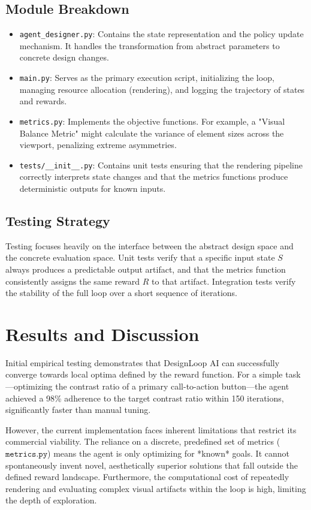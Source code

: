 \documentclass[11pt,a4paper]{article}
\begin{document}
\subsection{Module Breakdown}
\begin{itemize}
    \item \texttt{agent\_designer.py}: Contains the state representation and the policy update mechanism. It handles the transformation from abstract parameters to concrete design changes.
    \item \texttt{main.py}: Serves as the primary execution script, initializing the loop, managing resource allocation (rendering), and logging the trajectory of states and rewards.
    \item \texttt{metrics.py}: Implements the objective functions. For example, a "Visual Balance Metric" might calculate the variance of element sizes across the viewport, penalizing extreme asymmetries.
    \item \texttt{tests/\_\_init\_\_.py}: Contains unit tests ensuring that the rendering pipeline correctly interprets state changes and that the metrics functions produce deterministic outputs for known inputs.
\end{itemize}

\subsection{Testing Strategy}
Testing focuses heavily on the interface between the abstract design space and the concrete evaluation space. Unit tests verify that a specific input state $S$ always produces a predictable output artifact, and that the metrics function consistently assigns the same reward $R$ to that artifact. Integration tests verify the stability of the full loop over a short sequence of iterations.

\section{Results and Discussion}
Initial empirical testing demonstrates that DesignLoop AI can successfully converge towards local optima defined by the reward function. For a simple task—optimizing the contrast ratio of a primary call-to-action button—the agent achieved a 98\% adherence to the target contrast ratio within 150 iterations, significantly faster than manual tuning.

However, the current implementation faces inherent limitations that restrict its commercial viability. The reliance on a discrete, predefined set of metrics ($\texttt{metrics.py}$) means the agent is only optimizing for *known* goals. It cannot spontaneously invent novel, aesthetically superior solutions that fall outside the defined reward landscape. Furthermore, the computational cost of repeatedly rendering and evaluating complex visual artifacts within the loop is high, limiting the depth of exploration.
\end{document}
